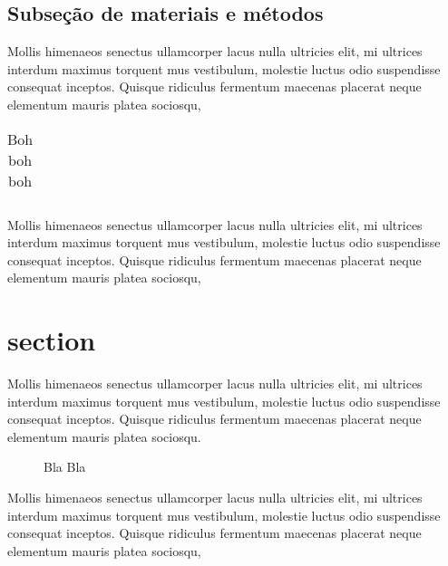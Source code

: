 \documentclass[msc, classic, a4paper, oneside]{ufbathesis}
\begin{document}
\subsection{Subseção de materiais e métodos}
Mollis himenaeos senectus ullamcorper lacus nulla ultricies elit, mi ultrices interdum maximus torquent mus vestibulum, molestie luctus odio suspendisse consequat inceptos. Quisque ridiculus fermentum maecenas placerat neque elementum mauris platea sociosqu, 

\begin{table}[hb]
\caption{Boh boh boh}
\begin{tabular}{|l|l|r|}
\end{tabular}
\label{tab:boh}
\end{table}


Mollis himenaeos senectus ullamcorper lacus nulla ultricies elit, mi ultrices interdum maximus torquent mus vestibulum, molestie luctus odio suspendisse consequat inceptos. Quisque ridiculus fermentum maecenas placerat neque elementum mauris platea sociosqu, 


\section{section}
Mollis himenaeos senectus ullamcorper lacus nulla ultricies elit, mi ultrices interdum maximus torquent mus vestibulum, molestie luctus odio suspendisse consequat inceptos. Quisque ridiculus fermentum maecenas placerat neque elementum mauris platea sociosqu.

\begin{figure}
\caption{Bla Bla}
\label{fig:bla}
\end{figure}


Mollis himenaeos senectus ullamcorper lacus nulla ultricies elit, mi ultrices interdum maximus torquent mus vestibulum, molestie luctus odio suspendisse consequat inceptos. Quisque ridiculus fermentum maecenas placerat neque elementum mauris platea sociosqu, 



\backmatter
\appendix

\end{document}
